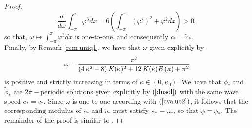 \documentclass[12pt,reqno]{amsart}
\newcommand{\2}{L^2_{per}(0, T)}
\numberwithin{equation}{section}
\numberwithin{figure}{section}
\begin{document}
\begin{proof}
			\begin{equation}\label{eqsol6}
				\displaystyle
				\frac{d}{d\omega}\int_{-\pi}^{\pi}\varphi^3dx = 6\left(\int_{-\pi}^{\pi}(\varphi')^2+\varphi^2 dx\right) >0,
			\end{equation}
		so that, $\omega\mapsto\int_{-\pi}^{\pi}\varphi^3dx$ is one-to-one, and consequently $c_*=\tilde{c}_*$.\\
			\indent Finally, by  Remark \ref{rem-uniq1}, we have that $\omega$  given explicitly by
			\begin{equation}\label{cvalue2}	
				\omega={\frac {{\pi }^{2}}{ \left( 4\,{\kappa}^{2}-8 \right)   {\it K}(\kappa)^{2}+12\,{\it K} ( \kappa){\it E} \left( \kappa \right) +{\pi }^{2}}}
			\end{equation}
			is positive and strictly increasing in terms of $\kappa\in(0,\kappa_0)$. We have that $\phi_{*}$ and $\tilde{\phi}_{*}$ are $2\pi-$periodic solutions given explicitly by $(\ref{dnsol})$ with the same wave speed $c_*=\tilde{c}_*$. Since $\omega$ is one-to-one according with $(\ref{cvalue2})$, it follows that the corresponding modulus of $c_*$ and $\tilde{c}_*$ must satisfy $\kappa_*=\tilde{\kappa}_*$, so that $\tilde{\phi}\equiv\phi_*$. The remainder of the proof is similar to \cite[Theorem 2.4]{FL}.



\end{proof}
\end{document}
